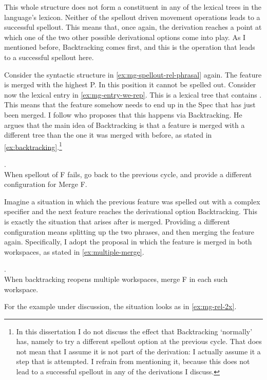 This whole structure does not form a constituent in any of the lexical trees in the language's lexicon. Neither of the spellout driven movement operations leads to a successful spellout. This means that, once again, the derivation reaches a point at which one of the two other possible derivational options come into play. As I mentioned before, Backtracking comes first, and this is the operation that leads to a successful spellout here.

Consider the syntactic structure in \ref{ex:mg-spellout-rel-phrasal} again. The feature  is merged with the highest P. In this position it cannot be spelled out.
Consider now the lexical entry in \ref{ex:mg-entry-we-rep}. This is a lexical tree that contains . This means that the feature  somehow needs to end up in the Spec that has just been merged.
I follow \citet{caha2019} who proposes that this happens via Backtracking. He argues that the main idea of Backtracking is that a feature is merged with a different tree than the one it was merged with before, as stated in \ref{ex:backtracking}.\footnote{
In this dissertation I do not discuss the effect that Backtracking `normally' has, namely to try a different spellout option at the previous cycle. That does not mean that I assume it is not part of the derivation: I actually assume it a step that is attempted. I refrain from mentioning it, because this does not lead to a successful spellout in any of the derivations I discuss.
}

\ex.  \\\label{ex:backtracking}
When spellout of F fails, go back to the previous cycle, and provide a different configuration for Merge F.

Imagine a situation in which the previous feature was spelled out with a complex specifier and the next feature reaches the derivational option Backtracking. This is exactly the situation that arises after  is merged. Providing a different configuration means splitting up the two phrases, and then merging the feature again. Specifically, I adopt the proposal in which the feature is merged in both workspaces, as stated in \ref{ex:multiple-merge}.

\ex.  \\\label{ex:multiple-merge}
When backtracking reopens multiple workspaces, merge F in each such workspace.

For the example under discussion, the situation looks as in \ref{ex:mg-rel-2x}.

